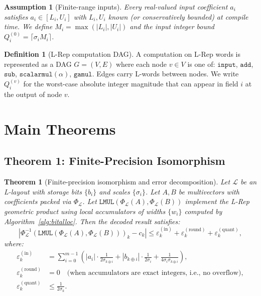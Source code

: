 \documentclass[11pt,a4paper]{article}
\theoremstyle{definition}
\newtheorem{definition}{Definition}[section]
\theoremstyle{plain}
\newtheorem{theorem}{Theorem}[section]
\newtheorem{assumption}{Assumption}[section]
\theoremstyle{remark}
\newcommand{\Pack}{\Phi_{\mathcal{L}}}
\newcommand{\Unpack}{\Phi^{-1}_{\mathcal{L}}}
\begin{document}
\begin{assumption}[Finite-range inputs]
\label{ass:range}
Every real-valued input coefficient $a_i$ satisfies $a_i \in [L_i, U_i]$ with $L_i, U_i$ known (or conservatively bounded) at compile time.  We define $M_i = \max(|L_i|, |U_i|)$ and the \emph{input integer bound} $Q_i^{(0)} = \lceil \sigma_i M_i \rceil$.
\end{assumption}

\begin{definition}[L-Rep computation DAG]
A computation on L-Rep words is represented as a DAG $G=(V,E)$ where each node $v\in V$ is one of: $\mathtt{input}$, $\mathtt{add}$, $\mathtt{sub}$, $\mathtt{scalarmul}(\alpha)$, $\mathtt{gamul}$.  Edges carry L-words between nodes.  We write $Q^{(v)}_i$ for the worst-case absolute integer magnitude that can appear in field $i$ at the output of node $v$.
\end{definition}

\section{Main Theorems}
\label{sec:main}

\subsection{Theorem 1: Finite-Precision Isomorphism}

\begin{theorem}[Finite-precision isomorphism and error decomposition]
\label{thm:finite-isom}
Let $\mathcal{L}$ be an L-layout with storage bits $\{b_i\}$ and scales $\{\sigma_i\}$.  Let $A,B$ be multivectors with coefficients packed via $\Pack$.  Let $\mathtt{LMUL}(\Pack(A),\Pack(B))$ implement the L-Rep geometric product using local accumulators of widths $\{w_i\}$ computed by Algorithm~\ref{alg:bitalloc}.  Then the decoded result satisfies:
\begin{equation}\label{eq:error-main}
  \left| \Unpack(\mathtt{LMUL}(\Pack(A),\Pack(B)))_k - c_k \right| \le \varepsilon_k^{(\mathrm{in})} + \varepsilon_k^{(\mathrm{round})} + \varepsilon_k^{(\mathrm{quant})},
\end{equation}
where:
\begin{align}
  \varepsilon_k^{(\mathrm{in})} &= \sum_{i=0}^{m-1} \left( |a_i| \cdot \frac{1}{2\sigma_{k\oplus i}} + |b_{k\oplus i}| \cdot \frac{1}{2\sigma_i} + \frac{1}{4\sigma_i\sigma_{k\oplus i}} \right), \label{eq:eps-in}\\
  \varepsilon_k^{(\mathrm{round})} &= 0 \quad\text{(when accumulators are exact integers, i.e., no overflow)},\label{eq:eps-round}\\
  \varepsilon_k^{(\mathrm{quant})} &\le \frac{1}{2\sigma_k}. \label{eq:eps-quant}
\end{align}
\end{theorem}
\end{document}
